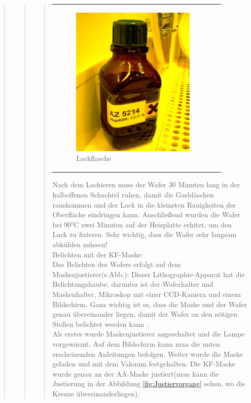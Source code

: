 \begin{quote}
\begin{quote}
\begin{quote}
\begin{center}
\begin{tabular}{ll}
\begin{minipage}{0.3\textwidth}
                        \begin{figure}[H]
                        \hspace{-1em}
                            \includegraphics[scale=1.0, trim = 0cm 0cm 0cm
                            0cm, clip]
                            {./HerstellungBilder/Lackflasche.png}
                            \caption{Lackflasche}
                           \label{fig:lackfl}
                        \end{figure}
                    \vspace{-1.5em}

                    \end{minipage}

                \end{tabular}
			\end{center}
    
    		\vspace{2em}
    		
    		Nach dem Lackieren muss der Wafer 30 Minuten lang in der halboffenen 
    		Schachtel ruhen, damit die Gasbläschen rauskommen und der Lack in 
    		die kleinsten Rauigkeiten der Oberfläche eindringen kann. 
    		Anschließend wurden die Wafer bei 90°C zwei Minuten auf der 
    		Heizplatte erhitzt, um den Lack zu fixieren. Sehr wichtig, dass die 
    		Wafer sehr langsam abkühlen müssen!\\

			Belichten mit der KF-Maske:\\
			Das Belichten des Wafers erfolgt auf dem Maskenjustierer(s.Abb.):
			Dieser Lithographie-Apparat hat die Belichtungshaube, darunter ist 
			der Waferhalter und Maskenhalter,  Mikroskop mit einer CCD-Kamera 
			und einem Bildschirm.
			Ganz wichtig ist es, dass die Maske und der Wafer genau übereinander 
			liegen, damit der Wafer an den nötigen Stellen belichtet werden kann
			.\\
 			Als erstes wurde Maskenjustierer angeschaltet und die Lampe 
 			vorgewärmt. Auf dem Bildschirm kann man die unten erscheinenden 
 			Anleitungen befolgen. Weiter wurde die Maske geladen und mit dem 
 			Vakuum festgehalten. Die KF-Maske wurde genau an der AA-Maske 
 			justiert(man kann die Justierung in der Abbildung 
 			\ref{fig:Justiervorgang} sehen, wo die Kreuze übereinanderliegen). 
 			

\end{quote}
\end{quote}
\end{quote}
